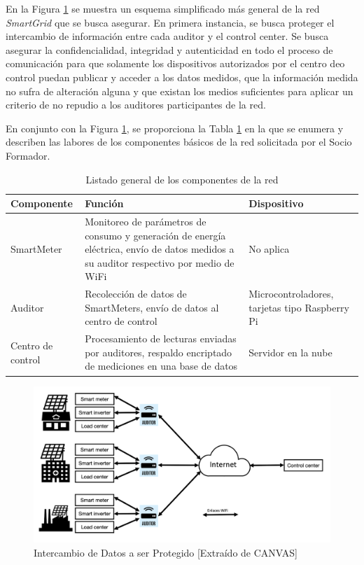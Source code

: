 \documentclass{article}
\begin{document}
            En la Figura \ref{fig:dataExchange} se muestra un esquema simplificado más general de la red \textit{SmartGrid} que se busca asegurar. En primera instancia, se busca proteger el intercambio de información entre cada auditor y el control center. Se busca asegurar la confidencialidad, integridad y autenticidad en todo el proceso de comunicación para que solamente los dispositivos autorizados por el centro deo control puedan publicar y acceder a los datos medidos, que la información medida no sufra de alteración alguna y que existan los medios suficientes para aplicar un criterio de no repudio a los auditores participantes de la red.

            En conjunto con la Figura \ref{fig:dataExchange}, se proporciona la Tabla \ref{tab:component_basic} en la que se enumera y describen las labores de los componentes básicos de la red solicitada por el Socio Formador.
            \begin{table}[htbp]
                \centering
                \begin{tabularx}{\textwidth}{ |l|X|X| }
                    \hline
                    Componente & Función & Dispositivo \\
                    \hline
                    SmartMeter	& Monitoreo de parámetros de consumo y generación de energía eléctrica, envío de datos medidos a su auditor respectivo por medio de WiFi & No aplica \\
                    \hline
                    Auditor	& Recolección de datos de SmartMeters, envío de datos al centro de control & Microcontroladores, tarjetas tipo Raspberry Pi \\
                    \hline
                    Centro de control & Procesamiento de lecturas enviadas por auditores, respaldo encriptado de mediciones en una base de datos & Servidor en la nube \\
                    \hline
                \end{tabularx}
                \label{tab:component_basic}
                \caption{Listado general de los componentes de la red}
            \end{table}

            \begin{figure}[htbp]
                \centering
                \includegraphics[scale=0.30]{img/dataExchange.png}
                \caption{Intercambio de Datos a ser Protegido [Extraído de CANVAS]}
                \label{fig:dataExchange}
            \end{figure}
\end{document}
